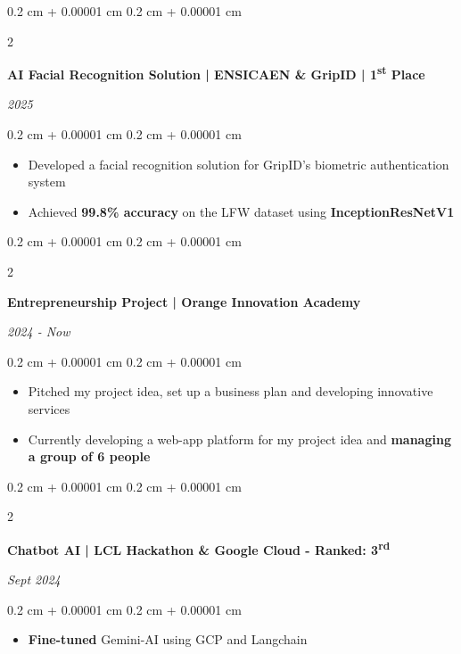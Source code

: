 \documentclass[10pt, letterpaper]{article}
\newenvironment{highlights}{
    \begin{itemize}[
        topsep=0.10 cm,
        parsep=0.10 cm,
        partopsep=0pt,
        itemsep=0pt,
        leftmargin=0.4 cm + 10pt
    ]
}{
    \end{itemize}
} %
\newenvironment{onecolentry}{
    \begin{adjustwidth}{
        0.2 cm + 0.00001 cm
    }{
        0.2 cm + 0.00001 cm
    }
}{
    \end{adjustwidth}
} %
\newenvironment{twocolentry}[2][]{
    \onecolentry
    \def\secondColumn{#2}
    \setcolumnwidth{\fill, 4.5 cm}
    \begin{paracol}{2}
}{
    \switchcolumn \raggedleft \secondColumn
    \end{paracol}
    \endonecolentry
} %
\begin{document}
        \begin{twocolentry}{
        
        \textit{2025}}
            \textbf{AI Facial Recognition Solution | \textcolor{clearblue}{ENSICAEN \& GripID} | \textbf{1\textsuperscript{st} Place}}
        \end{twocolentry}

        \vspace{0.10 cm}
        \begin{onecolentry}
            \begin{highlights}
                \item Developed a facial recognition solution for GripID's biometric authentication system
                \item Achieved \textbf{99.8\% accuracy} on the LFW dataset using \textbf{InceptionResNetV1}
            \end{highlights}
        \end{onecolentry}
        
        \begin{twocolentry}{
        \textit{2024 - Now}}
            \textbf{Entrepreneurship Project | \textcolor{clearblue}{Orange Innovation Academy}}
        \end{twocolentry}

        \vspace{0.10 cm}
        \begin{onecolentry}
            \begin{highlights}
                \item  Pitched my project idea, set up a business plan and developing innovative services
                \item Currently developing a web-app platform for my project idea and \textbf{managing a group of 6 people}
            \end{highlights}
        \end{onecolentry}

        \vspace{0.1 cm}
        
        \begin{twocolentry}{
            
            
        \textit{Sept 2024}}
            \textbf{Chatbot AI | \textcolor{clearblue}{LCL Hackathon \& Google Cloud - Ranked: 3\textsuperscript{rd}}}
        \end{twocolentry}

        \vspace{0.10 cm}
        \begin{onecolentry}
            \begin{highlights}
                \item \textbf{Fine-tuned} Gemini-AI using GCP and Langchain
            \end{highlights}
        \end{onecolentry}
\end{document}
